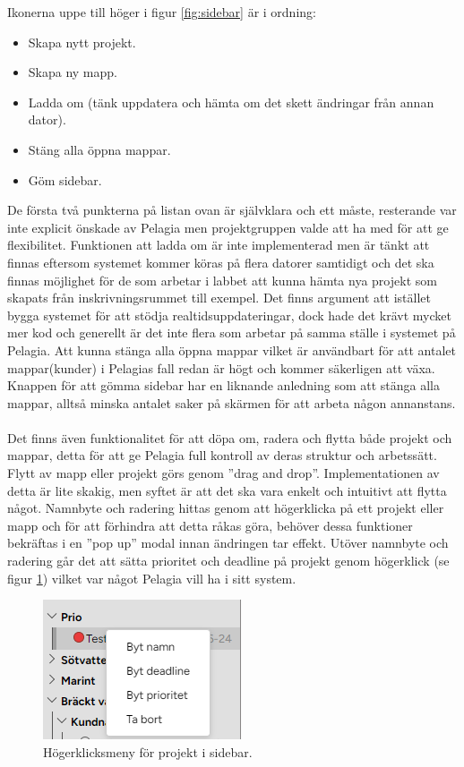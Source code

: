 \noindent Ikonerna uppe till höger i figur \ref{fig:sidebar} är i ordning:
\begin{itemize}
    \item Skapa nytt projekt.
    \item Skapa ny mapp.
    \item Ladda om (tänk uppdatera och hämta om det skett ändringar från annan dator).
    \item Stäng alla öppna mappar.
    \item Göm sidebar.
\end{itemize}

\noindent De första två punkterna på listan ovan är självklara och ett måste, resterande var inte explicit önskade av Pelagia men projektgruppen valde att ha med för att ge flexibilitet.
Funktionen att ladda om är inte implementerad men är tänkt att finnas eftersom systemet kommer köras på flera datorer samtidigt och det ska finnas möjlighet för de som arbetar i labbet att kunna hämta nya projekt som skapats från inskrivningsrummet till exempel.
Det finns argument att istället bygga systemet för att stödja realtidsuppdateringar, dock hade det krävt mycket mer kod och generellt är det inte flera som arbetar på samma ställe i systemet på Pelagia.
Att kunna stänga alla öppna mappar vilket är användbart för att antalet mappar(kunder) i Pelagias fall redan är högt och kommer säkerligen att växa. Knappen för att gömma sidebar har en liknande anledning som att stänga alla mappar, alltså minska antalet saker på skärmen för att arbeta någon annanstans.
\\\\
Det finns även funktionalitet för att döpa om, radera och flytta både projekt och mappar, detta för att ge Pelagia full kontroll av deras struktur och arbetssätt. Flytt av mapp eller projekt görs genom ''drag and drop''. Implementationen av detta är
lite skakig, men syftet är att det ska vara enkelt och intuitivt att flytta något. Namnbyte och radering hittas genom att högerklicka på ett projekt eller mapp och för att förhindra att detta råkas göra, behöver dessa funktioner bekräftas i en ''pop up'' modal innan ändringen tar effekt.
Utöver namnbyte och radering går det att sätta prioritet och deadline på projekt genom högerklick (se figur \ref{fig:sidebar_menu}) vilket var något Pelagia vill ha i sitt system. 
\begin{figure}[H]
    \centering
    \includegraphics[width=0.5\linewidth]{images/sidebar_menu.png}
    \caption{Högerklicksmeny för projekt i sidebar.}
    \label{fig:sidebar_menu}
\end{figure}
